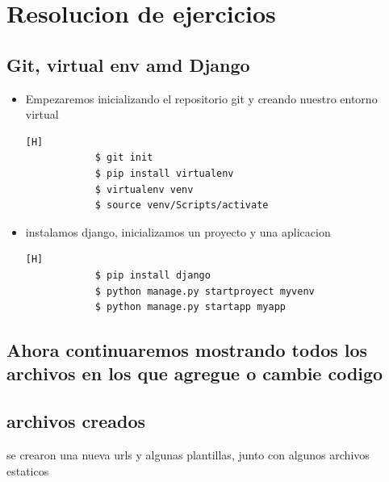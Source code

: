 \documentclass{article}
\begin{document}
	\section{Resolucion de ejercicios}
	
	\subsection{Git, virtual env amd Django}
	\begin{itemize}	
		\item Empezaremos inicializando el repositorio git y creando nuestro entorno virtual
        \begin{lstlisting}[language=bash, caption={git and virtual env}][H]
            $ git init
            $ pip install virtualenv
            $ virtualenv venv
            $ source venv/Scripts/activate
        \end{lstlisting}
		\item instalamos django, inicializamos un proyecto y una aplicacion
		
    	\begin{lstlisting}[language=bash,caption={proyect django}][H]
    		$ pip install django
            $ python manage.py startproyect myvenv
            $ python manage.py startapp myapp
    	\end{lstlisting}
    \end{itemize}
    \subsection{Ahora continuaremos mostrando todos los archivos en los que agregue o cambie codigo} 
		
	
	
	
	\subsection{archivos creados}
        \item se crearon una nueva urls y algunas plantillas, junto con algunos archivos estaticos
	
	
	
	
	
	
\end{document}
